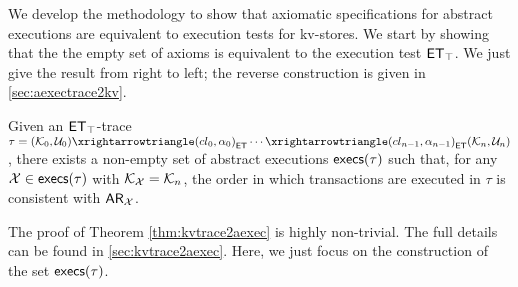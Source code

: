 %



We develop the methodology  to show that 
axiomatic specifications for abstract executions are equivalent to
execution tests  for kv-stores. 
We start by showing that  the 
the empty set of axioms is equivalent to the
execution test $\mathsf{ET}_{\top}$.  We just  give the result from right to
left; the reverse construction is given in  \cref{sec:aexectrace2kv}. 


\begin{theorem}
\label{thm:kvtrace2aexec}
Given an $\mathsf{ET}_{\top}$-trace $\tau = (\mkvs_{0}, \vienv_{0}) \toET{(\cl_{0}, \alpha_{0})} \cdots \toET{(\cl_{n-1}, \alpha_{n-1})} (\mkvs_{n}, \vienv_{n})$, 
there exists a non-empty set of abstract executions $\execs(\tau)$
such that, for any $\aexec \in \execs(\tau) $ with $\mathcal{K}_{\mathcal{X}} = \mathcal{K}_{n}$, 
the order in which transactions are executed in $\tau$ is consistent with $\mathsf{AR}_{\mathcal{X}}$. 
\end{theorem}
\noindent The proof of Theorem \ref{thm:kvtrace2aexec} is highly
non-trivial. The full details can be found in
\cref{sec:kvtrace2aexec}.   Here, we just focus on  the construction of the set
$\execs(\tau)$. 


